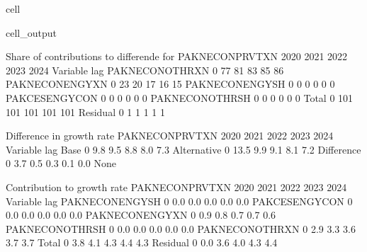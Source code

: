 \documentclass[letterpaper,10pt,english]{jupyterBook}
\begin{document}
\begin{sphinxuseclass}{cell}
\begin{sphinxVerbatimOutput}
\begin{sphinxuseclass}{cell_output}
\begin{sphinxVerbatim}[commandchars=\\\{\}]
 Share of contributions to differende for  PAKNECONPRVTXN
                          2020        2021        2022        2023        2024
Variable       lag                                                            
PAKNECONOTHRXN 0           77\PYGZpc{}         81\PYGZpc{}         83\PYGZpc{}         85\PYGZpc{}         86\PYGZpc{}
PAKNECONENGYXN 0           23\PYGZpc{}         20\PYGZpc{}         17\PYGZpc{}         16\PYGZpc{}         15\PYGZpc{}
PAKNECONENGYSH 0           \PYGZhy{}0\PYGZpc{}         \PYGZhy{}0\PYGZpc{}         \PYGZhy{}0\PYGZpc{}         \PYGZhy{}0\PYGZpc{}         \PYGZhy{}0\PYGZpc{}
PAKCESENGYCON  0           \PYGZhy{}0\PYGZpc{}         \PYGZhy{}0\PYGZpc{}         \PYGZhy{}0\PYGZpc{}         \PYGZhy{}0\PYGZpc{}         \PYGZhy{}0\PYGZpc{}
PAKNECONOTHRSH 0           \PYGZhy{}0\PYGZpc{}         \PYGZhy{}0\PYGZpc{}         \PYGZhy{}0\PYGZpc{}         \PYGZhy{}0\PYGZpc{}         \PYGZhy{}0\PYGZpc{}
Total          0          101\PYGZpc{}        101\PYGZpc{}        101\PYGZpc{}        101\PYGZpc{}        101\PYGZpc{}
Residual       0            1\PYGZpc{}          1\PYGZpc{}          1\PYGZpc{}          1\PYGZpc{}          1\PYGZpc{}

 Difference in growth rate PAKNECONPRVTXN
                       2020        2021        2022        2023        2024
Variable    lag                                                            
Base        0          9.8\PYGZpc{}        9.5\PYGZpc{}        8.8\PYGZpc{}        8.0\PYGZpc{}        7.3\PYGZpc{}
Alternative 0         13.5\PYGZpc{}        9.9\PYGZpc{}        9.1\PYGZpc{}        8.1\PYGZpc{}        7.2\PYGZpc{}
Difference  0          3.7\PYGZpc{}        0.5\PYGZpc{}        0.3\PYGZpc{}        0.1\PYGZpc{}       \PYGZhy{}0.0\PYGZpc{}
None

 Contribution to growth rate PAKNECONPRVTXN
                          2020        2021        2022        2023        2024
Variable       lag                                                            
PAKNECONENGYSH 0         \PYGZhy{}0.0\PYGZpc{}       \PYGZhy{}0.0\PYGZpc{}       \PYGZhy{}0.0\PYGZpc{}       \PYGZhy{}0.0\PYGZpc{}       \PYGZhy{}0.0\PYGZpc{}
PAKCESENGYCON  0         \PYGZhy{}0.0\PYGZpc{}       \PYGZhy{}0.0\PYGZpc{}       \PYGZhy{}0.0\PYGZpc{}       \PYGZhy{}0.0\PYGZpc{}       \PYGZhy{}0.0\PYGZpc{}
PAKNECONENGYXN 0          0.9\PYGZpc{}        0.8\PYGZpc{}        0.7\PYGZpc{}        0.7\PYGZpc{}        0.6\PYGZpc{}
PAKNECONOTHRSH 0         \PYGZhy{}0.0\PYGZpc{}       \PYGZhy{}0.0\PYGZpc{}       \PYGZhy{}0.0\PYGZpc{}       \PYGZhy{}0.0\PYGZpc{}       \PYGZhy{}0.0\PYGZpc{}
PAKNECONOTHRXN 0          2.9\PYGZpc{}        3.3\PYGZpc{}        3.6\PYGZpc{}        3.7\PYGZpc{}        3.7\PYGZpc{}
Total          0          3.8\PYGZpc{}        4.1\PYGZpc{}        4.3\PYGZpc{}        4.4\PYGZpc{}        4.3\PYGZpc{}
Residual       0          0.0\PYGZpc{}        3.6\PYGZpc{}        4.0\PYGZpc{}        4.3\PYGZpc{}        4.4\PYGZpc{}
\end{sphinxVerbatim}


\end{sphinxuseclass}
\end{sphinxVerbatimOutput}
\end{sphinxuseclass}
\end{document}
